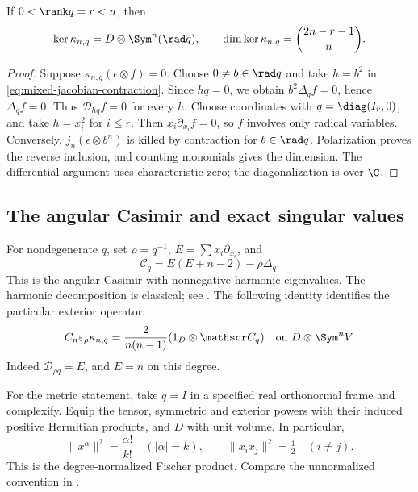 \begin{corollary}
\label{cor:singular-kernel-mixed}
If \(0<\rank q=r<n\), then
\[
 \ker\kappa_{n,q}=D\otimes\Sym^n(\rad q),\qquad
 \dim\ker\kappa_{n,q}=\binom{2n-r-1}{n}.
\]
\end{corollary}
\begin{proof}
Suppose \(\kappa_{n,q}(\epsilon\otimes f)=0\). Choose
\(0\ne b\in\rad q\) and take \(h=b^2\) in
\eqref{eq:mixed-jacobian-contraction}. Since \(hq=0\),
we obtain \(b^2\Delta_qf=0\), hence \(\Delta_qf=0\).
Thus \(\mathcal D_{hq}f=0\) for every \(h\). Choose
coordinates with \(q=\diag(I_r,0)\), and take \(h=x_i^2\)
for \(i\le r\). Then \(x_i\partial_{x_i}f=0\), so
\(f\) involves only radical variables. Conversely,
\(j_n(\epsilon\otimes b^n)\) is killed by contraction for
\(b\in\rad q\). Polarization proves the reverse inclusion,
and counting monomials gives the dimension. The differential argument
uses characteristic zero; the diagonalization is over \(\C\).
\end{proof}

\subsection{The angular Casimir and exact singular values}

For nondegenerate \(q\), set \(\rho=q^{-1}\),
\(E=\sum x_i\partial_{x_i}\), and
\[
 \mathscr C_q=E(E+n-2)-\rho\Delta_q.
\]
This is the angular Casimir with nonnegative harmonic eigenvalues.
The harmonic decomposition is classical; see
\cite[Theorem~9 and \S4(a)]{HoweClassical}. The following identity
identifies the particular exterior operator:
\begin{equation}\label{eq:jacobian-casimir-composite}
 C_n\varepsilon_{\rho}\kappa_{n,q}
 =\frac{2}{n(n-1)}(1_D\otimes\mathscr C_q)
 \quad\hbox{on }D\otimes\Sym^nV.
\end{equation}
Indeed \(\mathcal D_{\rho q}=E\), and \(E=n\) on this degree.

For the metric statement, take \(q=I\) in a specified real
orthonormal frame and complexify. Equip the tensor, symmetric and
exterior powers with their induced positive Hermitian products, and
\(D\) with unit volume. In particular,
\begin{equation}\label{eq:normalized-fischer-metric}
 \|x^\alpha\|^2=\frac{\alpha!}{k!}\quad(|\alpha|=k),
 \qquad \|x_ix_j\|^2=\tfrac12\quad(i\ne j).
\end{equation}
This is the degree-normalized Fischer product. Compare the unnormalized
convention in \cite[Definition~6.1 and Lemma~6.2]{DeBieEelbodeRoels}.

